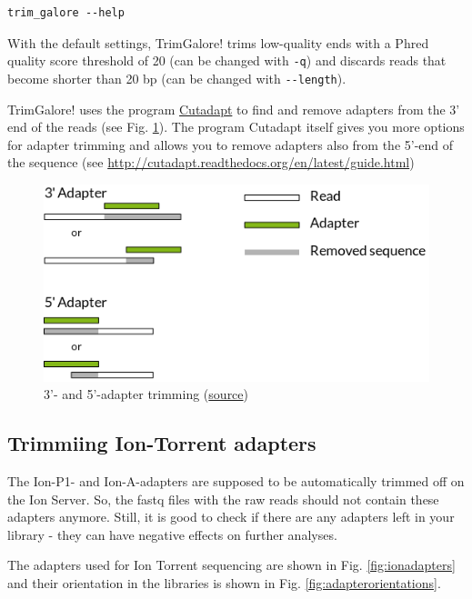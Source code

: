 \documentclass[11pt]{article}
\begin{document}
\begin{verbatim}
trim_galore --help
\end{verbatim}

With the default settings, TrimGalore! trims low-quality ends with a
Phred quality score threshold of 20 (can be changed with \texttt{-q}) and
discards reads that become shorter than 20 bp (can be changed with
\texttt{-{}-length}).

TrimGalore! uses the program \href{https://code.google.com/p/cutadapt/}{Cutadapt} to find and remove adapters from
the 3' end of the reads (see Fig. \ref{fig:adapters}). The program Cutadapt
itself gives you more options for adapter trimming and allows you to
remove adapters also from the 5'-end of the sequence (see
\url{http://cutadapt.readthedocs.org/en/latest/guide.html})

\begin{figure}[htb]
\centering
\includegraphics[width=14cm]{adapters.png}
\caption{\label{fig:adapters}3'- and 5'-adapter trimming (\href{http://cutadapt.readthedocs.org/en/latest/guide.html}{source})}
\end{figure}

\subsection{Trimmiing Ion-Torrent adapters}
\label{sec-3-1}

The Ion-P1- and Ion-A-adapters are supposed to be automatically
trimmed off on the Ion Server. So, the fastq files with the raw reads
should not contain these adapters anymore. Still, it is good to check
if there are any adapters left in your library - they can have
negative effects on further analyses.



The adapters used for Ion Torrent sequencing are shown in
Fig. \ref{fig:ionadapters} and their orientation in the libraries is shown
in Fig. \ref{fig:adapterorientations}.
\end{document}
